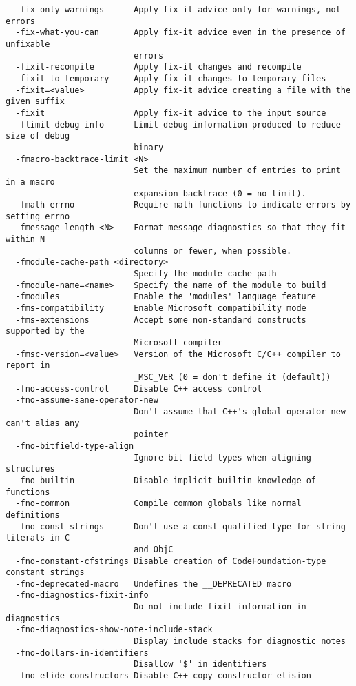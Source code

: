 \begin{verbatim}
  -fix-only-warnings      Apply fix-it advice only for warnings, not errors
  -fix-what-you-can       Apply fix-it advice even in the presence of unfixable 
                          errors
  -fixit-recompile        Apply fix-it changes and recompile
  -fixit-to-temporary     Apply fix-it changes to temporary files
  -fixit=<value>          Apply fix-it advice creating a file with the given suffix
  -fixit                  Apply fix-it advice to the input source
  -flimit-debug-info      Limit debug information produced to reduce size of debug 
                          binary
  -fmacro-backtrace-limit <N>
                          Set the maximum number of entries to print in a macro 
                          expansion backtrace (0 = no limit).
  -fmath-errno            Require math functions to indicate errors by setting errno
  -fmessage-length <N>    Format message diagnostics so that they fit within N 
                          columns or fewer, when possible.
  -fmodule-cache-path <directory>
                          Specify the module cache path
  -fmodule-name=<name>    Specify the name of the module to build
  -fmodules               Enable the 'modules' language feature
  -fms-compatibility      Enable Microsoft compatibility mode
  -fms-extensions         Accept some non-standard constructs supported by the 
                          Microsoft compiler
  -fmsc-version=<value>   Version of the Microsoft C/C++ compiler to report in 
                          _MSC_VER (0 = don't define it (default))
  -fno-access-control     Disable C++ access control
  -fno-assume-sane-operator-new
                          Don't assume that C++'s global operator new can't alias any
                          pointer
  -fno-bitfield-type-align
                          Ignore bit-field types when aligning structures
  -fno-builtin            Disable implicit builtin knowledge of functions
  -fno-common             Compile common globals like normal definitions
  -fno-const-strings      Don't use a const qualified type for string literals in C 
                          and ObjC
  -fno-constant-cfstrings Disable creation of CodeFoundation-type constant strings
  -fno-deprecated-macro   Undefines the __DEPRECATED macro
  -fno-diagnostics-fixit-info
                          Do not include fixit information in diagnostics
  -fno-diagnostics-show-note-include-stack
                          Display include stacks for diagnostic notes
  -fno-dollars-in-identifiers
                          Disallow '$' in identifiers
  -fno-elide-constructors Disable C++ copy constructor elision

\end{verbatim}
